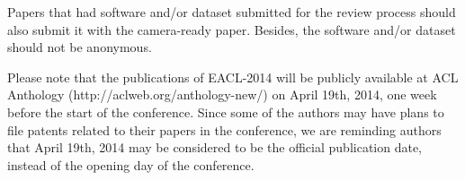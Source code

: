 \documentclass[11pt]{article}
\begin{document}
Papers that had software and/or dataset submitted for the review
process should also submit it with the camera-ready paper. Besides,
the software and/or dataset should not be anonymous.

Please note that the publications of EACL-2014 will be publicly
available at ACL Anthology (http://aclweb.org/anthology-new/) on April
19th, 2014, one week before the start of the conference. Since some of
the authors may have plans to file patents related to their papers in
the conference, we are reminding authors that April 19th, 2014 may be
considered to be the official publication date, instead of the opening
day of the conference.












\end{document}
